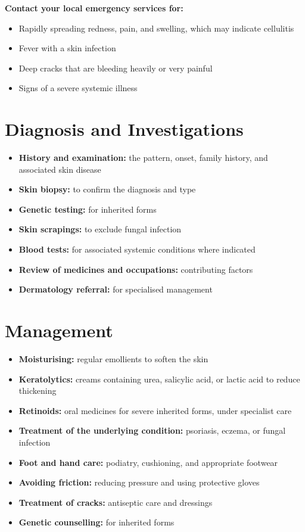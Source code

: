 \textbf{Contact your local emergency services for:}
\begin{itemize}
    \item Rapidly spreading redness, pain, and swelling, which may indicate cellulitis
    \item Fever with a skin infection
    \item Deep cracks that are bleeding heavily or very painful
    \item Signs of a severe systemic illness
\end{itemize}

\section*{Diagnosis and Investigations}
\begin{itemize}
    \item \textbf{History and examination:} the pattern, onset, family history, and associated skin disease
    \item \textbf{Skin biopsy:} to confirm the diagnosis and type
    \item \textbf{Genetic testing:} for inherited forms
    \item \textbf{Skin scrapings:} to exclude fungal infection
    \item \textbf{Blood tests:} for associated systemic conditions where indicated
    \item \textbf{Review of medicines and occupations:} contributing factors
    \item \textbf{Dermatology referral:} for specialised management
\end{itemize}

\section*{Management}
\begin{itemize}
    \item \textbf{Moisturising:} regular emollients to soften the skin
    \item \textbf{Keratolytics:} creams containing urea, salicylic acid, or lactic acid to reduce thickening
    \item \textbf{Retinoids:} oral medicines for severe inherited forms, under specialist care
    \item \textbf{Treatment of the underlying condition:} psoriasis, eczema, or fungal infection
    \item \textbf{Foot and hand care:} podiatry, cushioning, and appropriate footwear
    \item \textbf{Avoiding friction:} reducing pressure and using protective gloves
    \item \textbf{Treatment of cracks:} antiseptic care and dressings
    \item \textbf{Genetic counselling:} for inherited forms
\end{itemize}

